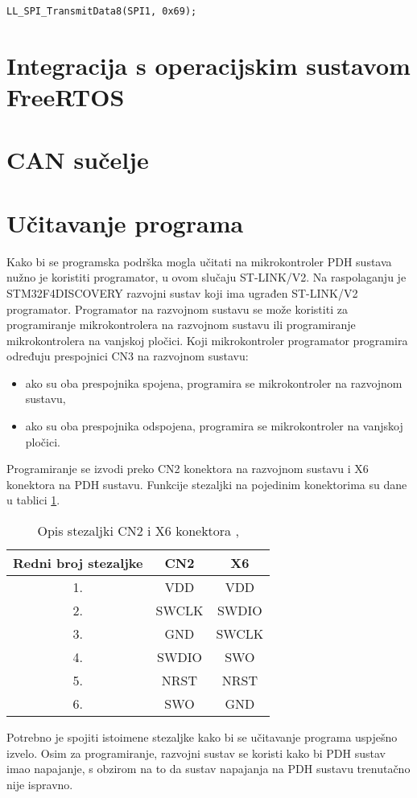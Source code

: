 \begin{lstlisting}[caption=Ispravan upis podatka u SPI2\_DR registar, label={lst:spi_dr_new}]
LL_SPI_TransmitData8(SPI1, 0x69);
\end{lstlisting}

\section{Integracija s operacijskim sustavom FreeRTOS}

\section{CAN sučelje}

\section{Učitavanje programa}

Kako bi se programska podrška mogla učitati na mikrokontroler PDH sustava nužno je koristiti programator, u ovom slučaju ST-LINK/V2. Na raspolaganju je \\ STM32F4DISCOVERY razvojni sustav koji ima ugrađen ST-LINK/V2 programator. Programator na razvojnom sustavu se može koristiti za programiranje mikrokontrolera na razvojnom sustavu ili programiranje mikrokontrolera na vanjskoj pločici. Koji mikrokontroler programator programira određuju prespojnici CN3 na razvojnom sustavu:
\begin{itemize}
	\item ako su oba prespojnika spojena, programira se mikrokontroler na razvojnom sustavu,
	\item ako su oba prespojnika odspojena, programira se mikrokontroler na vanjskoj pločici.
\end{itemize}
Programiranje se izvodi preko CN2 konektora na razvojnom sustavu i X6 konektora na PDH sustavu. Funkcije stezaljki na pojedinim konektorima su dane u tablici \ref{Tab:conn_func}.
\begin{center}
	\begin{table}[H]
		\centering
		\caption{Opis stezaljki CN2 i X6 konektora \cite{zavrsni_filip_juric}, \cite{disc_manual}}
		\begin{tabular}{| c | c | c |}
			\hline
			Redni broj stezaljke & CN2 & X6 \\
			\hline
			1. & VDD & VDD \\
			\hline
			2. & SWCLK & SWDIO \\
			\hline
			3. & GND & SWCLK \\
			\hline
			4. & SWDIO & SWO \\
			\hline
			5. & NRST & NRST \\
			\hline
			6. & SWO & GND \\
			\hline
		\end{tabular}
		\label{Tab:conn_func}
	\end{table}
\end{center}
Potrebno je spojiti istoimene stezaljke kako bi se učitavanje programa uspješno izvelo. Osim za programiranje, razvojni sustav se koristi kako bi PDH sustav imao napajanje, s obzirom na to da sustav napajanja na PDH sustavu trenutačno nije ispravno.